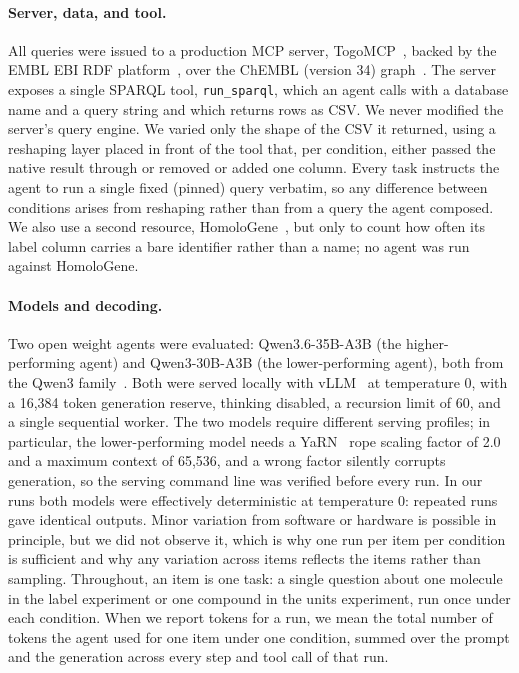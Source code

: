 \documentclass[sigconf]{ceurart}
\begin{document}
\paragraph{Server, data, and tool.}
All queries were issued to a production MCP server, TogoMCP~\cite{kinjo2026togomcp},
backed by the EMBL EBI RDF platform~\cite{jupp2014ebirdf}, over the ChEMBL (version
34) graph~\cite{zdrazil2024chembl}. The server exposes a single
SPARQL tool, \texttt{run\_sparql}, which an agent calls with a database name and a
query string and which returns rows as CSV. We never modified the server's query
engine. We varied only the shape of the CSV it returned, using a reshaping layer
placed in front of the tool that, per condition, either passed the native result
through or removed or added one column. Every task instructs the agent to run a
single fixed (pinned) query verbatim, so any difference between conditions arises
from reshaping rather than from a query the agent composed. We also use a second
resource, HomoloGene~\cite{ncbi2013resources}, but only to count how often its label
column carries a bare identifier rather than a name; no agent was run against
HomoloGene.

\paragraph{Models and decoding.}
Two open weight agents were evaluated: Qwen3.6-35B-A3B (the higher-performing
agent) and Qwen3-30B-A3B (the lower-performing agent), both from the Qwen3
family~\cite{qwen3technical}. Both were served locally
with vLLM~\cite{kwon2023vllm} at temperature 0, with a 16{,}384 token generation
reserve, thinking disabled, a recursion limit of 60, and a single sequential
worker. The two models require different serving profiles; in particular, the
lower-performing model needs a YaRN~\cite{peng2023yarn} rope scaling factor of 2.0
and a maximum context of 65{,}536, and a wrong
factor silently corrupts generation, so the serving command line was verified
before every run. In our runs both models were effectively deterministic at
temperature 0: repeated runs gave identical outputs. Minor variation from software
or hardware is possible in principle, but we did not observe it, which is why one
run per item per condition is sufficient and why any variation across items
reflects the items rather than sampling. Throughout, an item is one task: a single
question about one molecule in the label experiment or one compound in the units experiment, run
once under each condition. When we report tokens for a run, we mean the total
number of tokens the agent used for one item under one condition, summed over the
prompt and the generation across every step and tool call of that run.
\end{document}
